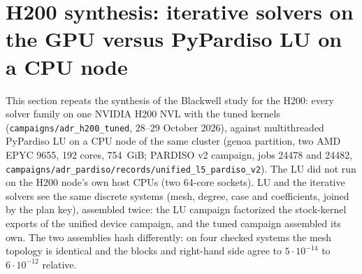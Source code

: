 \section{H200 synthesis: iterative solvers on the GPU versus PyPardiso LU on a CPU node}
\label{sec:adr-h200-synthesis}

This section repeats the synthesis of the Blackwell study for the H200: every solver family on
one NVIDIA H200 NVL with the tuned kernels (\texttt{campaigns/adr\_h200\_tuned}, 28--29 October
2026), against multithreaded PyPardiso LU on a CPU node of the same cluster (genoa partition, two
AMD EPYC 9655, 192 cores, 754~GiB; PARDISO v2 campaign, jobs 24478 and 24482,
\texttt{campaigns/adr\_pardiso/records/unified\_l5\_pardiso\_v2}). The LU did not run on the H200
node's own host CPUs (two 64-core sockets). LU and the iterative solvers see the same discrete
systems (mesh, degree, case and coefficients, joined by the plan key), assembled twice: the LU
campaign factorized the stock-kernel exports of the unified device campaign, and the tuned
campaign assembled its own. The two assemblies hash differently: on four checked systems the
mesh topology is identical and the blocks and right-hand side agree to $5\cdot10^{-14}$ to
$6\cdot10^{-12}$ relative.

